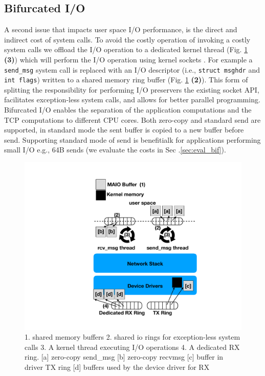 \subsection{Bifurcated I/O}\label{sec:bifurcated}
A second issue that impacts user space I/O performance, is the direct and indirect cost of system calls\cite{flexsc}.
To avoid the costly operation of invoking a costly system calls we offload the I/O operation to a dedicated kernel thread (Fig. \ref{fig:our_sys} \textbf{(3)}) which will perform the I/O operation using kernel sockets \cite{ktcp}. For example a \texttt{send\_msg} system call is replaced with an I/O descriptor (i.e., \texttt{struct msghdr} and \texttt{int flags}) written to a shared memory ring buffer (Fig. \ref{fig:our_sys} \textbf{(2)}). This form of splitting the responsibility for performing I/O preservers the existing socket API, facilitates exception-less system calls, and allows for better parallel programming. Bifurcated I/O enables the separation of the application computations and the TCP computations to different CPU cores. Both zero-copy and standard send are supported, in standard mode the sent buffer is copied to a new \oursys buffer before send. Supporting standard mode of send is benefitialk for applications performing small I/O e.g., 64B sends (we evaluate the costs in Sec .\ref{sec:eval_bif}).

\begin{figure}[t]
    \centering
    \includegraphics[width=0.8\columnwidth]{ktcp_z.pdf}
    \caption{1. \oursys shared memory buffers 2. shared io rings for exception-less system calls 3. A kernel thread executing I/O operations 4. A dedicated RX ring.
    [a] zero-copy send\_msg [b] zero-copy recvmsg [c] \oursys buffer in driver TX ring [d] \oursys buffers used by the device driver for RX}
    \label{fig:our_sys}
\end{figure} 

